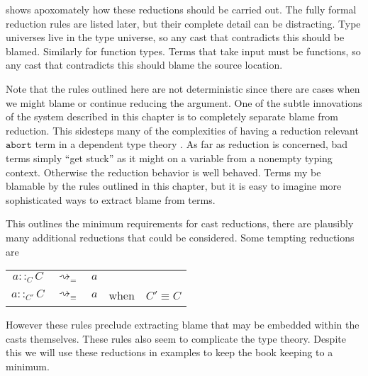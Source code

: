  shows apoxomately how these reductions should be carried out.
The fully formal reduction rules are listed later, but their complete detail can be distracting.
Type universes live in the type universe, so any cast that contradicts this should be blamed.
Similarly for function types.
Terms that take input must be functions, so any cast that contradicts this should blame the source location.

Note that the rules outlined here are not deterministic since there are cases when we might blame or continue reducing the argument.
One of the subtle innovations of the system described in this chapter is to completely separate blame from reduction.
This sidesteps many of the complexities of having a reduction relevant $\mathtt{abort}$ term in a dependent type theory \cite{sjoberg2012irrelevance,pedrot2018failure}.
As far as reduction is concerned, bad terms simply ``get stuck'' as it might on a variable from a nonempty typing context.
Otherwise the reduction behavior is well behaved.
Terms my be blamable by the rules outlined in this chapter, but it is easy to imagine more sophisticated ways to extract blame from terms. 

This outlines the minimum requirements for cast reductions, there are plausibly many additional reductions that could be considered.
Some tempting reductions are

\begin{tabular}{ccccc}
$a::_{C}C$ & $\rightsquigarrow_{=}$ & $a$ &  & \tabularnewline
$a::_{C'}C$ & $\rightsquigarrow_{\equiv}$ & $a$ & when & $C'\equiv C$\tabularnewline
\end{tabular}

However these rules preclude extracting blame that may be embedded within the casts themselves.
These rules also seem to complicate the type theory.
Despite this we will use these reductions in examples to keep the book keeping to a minimum.







